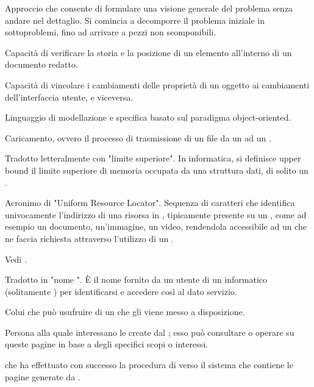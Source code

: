 {Approccio che consente di formulare una visione generale del problema senza andare nel dettaglio. Si comincia a decomporre il problema iniziale in sottoproblemi, fino ad arrivare a pezzi non scomponibili.}

{Capacità di verificare la storia e la posizione di un elemento all'interno di un documento redatto.}

{Capacità di vincolare i cambiamenti delle proprietà di un oggetto ai cambiamenti dell'interfaccia utente, e viceversa.}


{Linguaggio di modellazione e specifica basato sul paradigma object-oriented.}

{Caricamento, ovvero il processo di trasmissione di un file da un  ad un .}

{Tradotto letteralmente con "limite superiore". In informatica, si definisce upper bound il limite superiore di memoria occupata da una struttura dati, di solito un .}

{Acronimo di "Uniform Resource Locator". Sequenza di caratteri che identifica univocamente l'indirizzo di una risorsa in , tipicamente presente su un  , come ad esempio un documento, un'immagine, un video, rendendola accessibile ad un  che ne faccia richiesta attraverso l'utilizzo di un  .}

{Vedi .}

{Tradotto in "nome ". \`{E} il nome fornito da un utente di un  informatico (solitamente ) per identificarsi e accedere così al dato servizio.}

{Colui che può usufruire di un  che gli viene messo a disposizione.}

{Persona alla quale interessano le  create dal  ; esso può consultare o operare su queste pagine in base a degli specifici scopi o interessi.}

{ che ha effettuato con successo la procedura di  verso il sistema che contiene le pagine generate da .}

